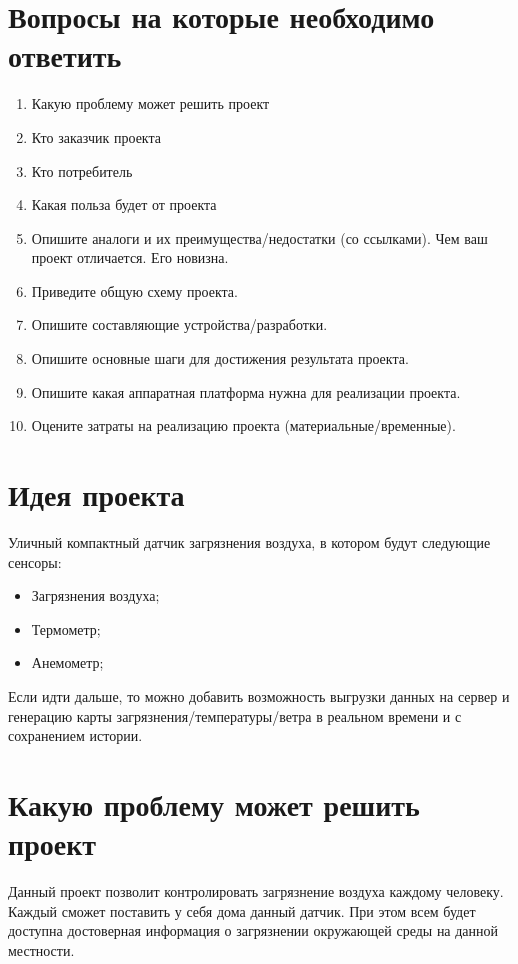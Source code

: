 \documentclass[a4paper,14pt]{article}
\begin{document}

%
\tableofcontents
\pagebreak

\section*{Вопросы на которые необходимо ответить}

\begin{enumerate}
\item Какую проблему может решить проект 
\item Кто заказчик проекта
\item Кто потребитель
\item Какая польза будет от проекта
\item Опишите аналоги и их преимущества/недостатки (со ссылками). Чем ваш проект отличается. Его новизна.
\item Приведите общую схему проекта. 
\item Опишите составляющие устройства/разработки.
\item Опишите основные шаги для достижения результата проекта.
\item Опишите какая аппаратная платформа нужна для реализации проекта.
\item Оцените затраты на реализацию проекта (материальные/временные).	
\end{enumerate}

\section{Идея проекта}

Уличный компактный датчик загрязнения воздуха, в котором будут следующие сенсоры:
\begin{itemize}
	 \item Загрязнения воздуха;
	 \item Термометр;
	 \item Анемометр;
\end{itemize}

Если идти дальше, то можно добавить возможность выгрузки данных на сервер и генерацию карты загрязнения/температуры/ветра в реальном времени и с сохранением истории.

\section{Какую проблему может решить проект }

Данный проект позволит контролировать загрязнение воздуха каждому человеку. Каждый сможет поставить у себя дома данный датчик. При этом всем будет доступна достоверная информация о загрязнении окружающей среды на данной местности.
\end{document}
